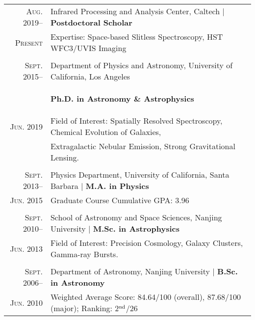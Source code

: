 \documentclass[letterpaper,10pt]{article}
\newcommand{\narrow}{-1.8ex}
\newcommand{\xnarrow}{-2.9ex}
\begin{document}
\begin{tabular}{r|p{5.7in}}
  \textsc{Aug. 2019}--      &   Infrared Processing and Analysis Center, Caltech    |   \textbf{Postdoctoral Scholar}   \\
  \textsc{Present}          &   Expertise: Space-based Slitless Spectroscopy, HST WFC3/UVIS Imaging \\
  \multicolumn{2}{c}{} \\[\narrow]
  \textsc{Sept. 2015}--     & Department of Physics and Astronomy, University of California, Los Angeles \\[\narrow]
                            &   \begin{flushright}
                                    \textbf{Ph.D. in Astronomy \& Astrophysics}
                                \end{flushright}    \\[\xnarrow]
  \textsc{Jun. 2019}        & Field of Interest: Spatially Resolved Spectroscopy, Chemical Evolution of Galaxies, \\
                            & \hspace*{7.4em} Extragalactic Nebular Emission, Strong Gravitational Lensing. \\
  \multicolumn{2}{c}{} \\[\narrow]
  \textsc{Sept. 2013}--     & Physics Department, University of California, Santa Barbara    |   \textbf{M.A. in Physics}   \\
  \textsc{Jun. 2015}        & Graduate Course Cumulative GPA: 3.96     \\
  \multicolumn{2}{c}{} \\[\narrow]
  \textsc{Sept. 2010}--     & School of Astronomy and Space Sciences, Nanjing University  |  \textbf{M.Sc. in Astrophysics}   \\
  \textsc{Jun. 2013}        & Field of Interest: Precision Cosmology, Galaxy Clusters, Gamma-ray Bursts. \\
  \multicolumn{2}{c}{} \\[\narrow]
  \textsc{Sept. 2006}--     &   Department of Astronomy, Nanjing University  |  \textbf{B.Sc. in Astronomy}    \\
  \textsc{Jun. 2010}        &   Weighted Average Score: 84.64/100 (overall), 87.68/100 (major); Ranking: 2$^{\rm nd}$/26
\end{tabular}
\end{document}
